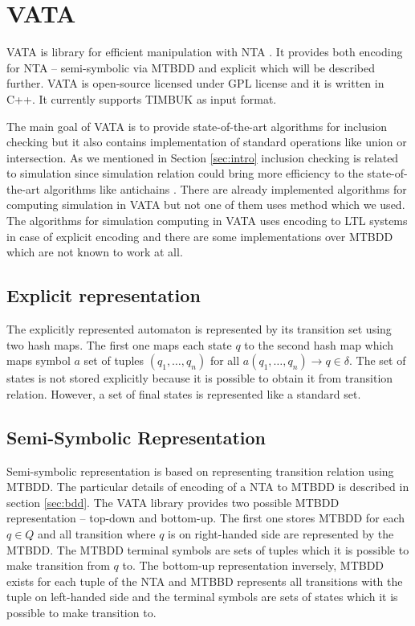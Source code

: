 \documentclass[a4paper, 12pt]{article}
\begin{document}
\section{VATA}
\label{sec:vata}
VATA is library for efficient manipulation with NTA \cite{libvata}.
It provides both encoding for NTA -- semi-symbolic via MTBDD and explicit which will be described further.
VATA is open-source licensed under GPL license and it is written in C++.
It currently supports TIMBUK as input format.

The main goal of VATA is to provide state-of-the-art algorithms for inclusion checking
but it also contains implementation of standard operations like union or intersection.
As we mentioned in Section \ref{sec:intro} inclusion checking is related to simulation
since simulation relation could bring more efficiency to the state-of-the-art algorithms like antichains \cite{tacas10}.
There are already implemented algorithms for computing simulation in VATA but not one of them uses method which we used.
The algorithms for simulation computing in VATA uses encoding to LTL systems \cite{tacas08} in case of explicit encoding
and there are some implementations over MTBDD which are not known to work at all.

\subsection{Explicit representation}

The explicitly represented automaton is represented by its transition set using two hash maps.
The first one maps each state $q$ to the second hash map which maps symbol $a$ set of tuples $(q_1,\ldots,q_n)$ for all $a(q_1, \ldots, q_n) \rightarrow q \in \delta$.
The set of states is not stored explicitly because it is possible to obtain it from transition relation.
However, a set of final states is represented like a standard set.

\subsection{Semi-Symbolic Representation}

Semi-symbolic representation is based on representing transition relation using MTBDD.
The particular details of encoding of a NTA to MTBDD is described in section \ref{sec:bdd}.
The VATA library provides two possible MTBDD representation -- top-down and bottom-up.
The first one stores MTBDD for each $q \in Q$ and all transition where $q$ is on right-handed side
are represented by the MTBDD.
The MTBDD terminal symbols are sets of tuples which it is possible to make transition from $q$ to.
The bottom-up representation inversely, MTBDD exists for each tuple of the NTA and MTBBD represents all transitions with
the tuple on left-handed side and the terminal symbols are sets of states which it is possible to make transition to.
\end{document}
